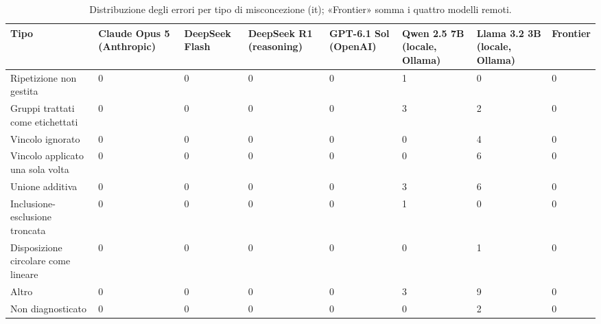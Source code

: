 \begin{table}[htbp]
\centering\small
\begin{tabularx}{\textwidth}{lXXXXXXX}
\toprule
Tipo & Claude Opus 5 (Anthropic) & DeepSeek Flash & DeepSeek R1 (reasoning) & GPT-6.1 Sol (OpenAI) & Qwen 2.5 7B (locale, Ollama) & Llama 3.2 3B (locale, Ollama) & Frontier \\
\midrule
Ripetizione non gestita & 0 & 0 & 0 & 0 & 1 & 0 & 0 \\
Gruppi trattati come etichettati & 0 & 0 & 0 & 0 & 3 & 2 & 0 \\
Vincolo ignorato & 0 & 0 & 0 & 0 & 0 & 4 & 0 \\
Vincolo applicato una sola volta & 0 & 0 & 0 & 0 & 0 & 6 & 0 \\
Unione additiva & 0 & 0 & 0 & 0 & 3 & 6 & 0 \\
Inclusione-esclusione troncata & 0 & 0 & 0 & 0 & 1 & 0 & 0 \\
Disposizione circolare come lineare & 0 & 0 & 0 & 0 & 0 & 1 & 0 \\
Altro & 0 & 0 & 0 & 0 & 3 & 9 & 0 \\
Non diagnosticato & 0 & 0 & 0 & 0 & 0 & 2 & 0 \\
\bottomrule
\end{tabularx}
\caption{Distribuzione degli errori per tipo di misconcezione (it); «Frontier» somma i quattro modelli remoti.}
\label{tab:misconcezioni-it}
\end{table}
